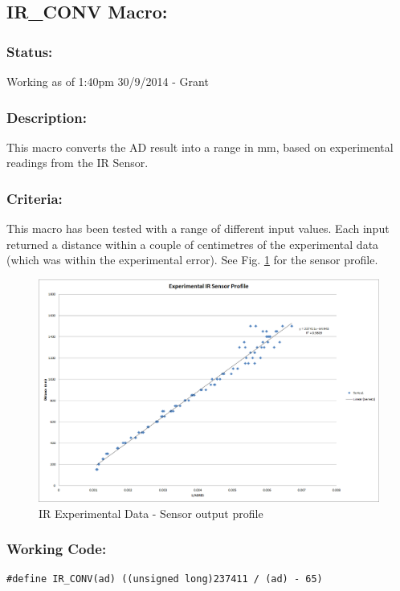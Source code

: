 \documentclass[]{report}
\begin{document}
\subsection{IR\_CONV Macro:}
\subsubsection{Status:}
Working as of 1:40pm 30/9/2014 - Grant

\subsubsection{Description:}
This macro converts the AD result into a range in mm, based on experimental readings from the IR Sensor.

\subsubsection{Criteria:}
This macro has been tested with a range of different input values. Each input returned a distance within a couple of centimetres of the experimental data (which was within the experimental error). See Fig. \ref{fig:IRExperimentalData} for the sensor profile.

\begin{figure}
\centering
\includegraphics[width=1\linewidth]{"IR Experimental Data"}
\caption{IR Experimental Data - Sensor output profile}
\label{fig:IRExperimentalData}
\end{figure}


\subsubsection{Working Code:}
\begin{lstlisting}
#define IR_CONV(ad) ((unsigned long)237411 / (ad) - 65)
\end{lstlisting}
\end{document}
